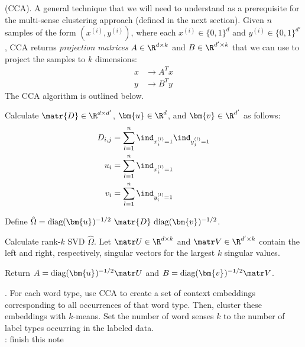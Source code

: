 \documentclass[11pt]{article}
\renewcommand\vec[2][]{\bm{#2}_{#1}}
\newcommand\myspace[1][]{\vspace{#1\bigskipamount}}
\newcommand\p{\Needspace{10\baselineskip} \noindent}
\begin{document}
\myspace
\p {} (CCA). A general technique that we will need to understand as a prerequisite for the multi-sense clustering approach (defined in the next section). Given $n$ samples of the form $(x^{(i)}, y^{(i)})$, where each $x^{(i)} \in \{0, 1\}^d$ and $y^{(i)} \in \{0, 1\}^{d'}$, CCA returns \textit{projection matrices} $A \in \R^{d \times k}$ and $B \in \R^{d' \times k}$ that we can use to project the samples to $k$ dimensions:
\begin{align}
	x &\longrightarrow A^T x \\
	y &\longrightarrow B^T y 
\end{align}
The CCA algorithm is outlined below.
\begin{example}
	\begin{compactenum}
		\item Calculate $\matr{D} \in \R^{d \times d'}$, $\vec u \in \R^d$, and $\vec v \in \R^{d'}$ as follows:
		\begin{align}
			D_{i,j} &= \sum_{l = 1}^{n} \ind_{x_i^{(l)} = 1}  \ind_{y_j^{(l)} = 1} \\
			u_i &= \sum_{l = 1}^{n}  \ind_{x_i^{(l)} = 1} \\
			v_i &= \sum_{l = 1}^{n}  \ind_{y_i^{(l)} = 1}
		\end{align}
		
		\item Define $\hat{\Omega} = \text{diag}(\vec u)^{-1/2} ~ \matr{D} ~ \text{diag}(\vec v)^{-1/2}$. 
		
		\item Calculate rank-$k$ SVD $\hat{\Omega}$. Let $\matr U \in \R^{d \times k}$ and $\matr V \in \R^{d' \times k}$ contain the left and right, respectively, singular vectors for the largest $k$ singular values. 
		
		\item Return $A = \text{diag}(\vec u)^{-1/2} \matr U$ and $B = \text{diag}(\vec v)^{-1/2} \matr V$. 
	\end{compactenum}
\end{example}

\myspace
\p {}. For each word type, use CCA to create a set of context embeddings corresponding to all occurrences of that word type. Then, cluster these embeddings with $k$-means. Set the number of word senses $k$ to the number of label types occurring in the labeled data.\\

: finish this note
\end{document}
